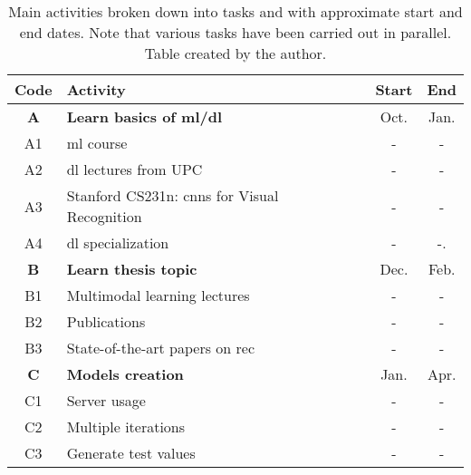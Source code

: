 \begin{table}[p]
  \centering
  \caption[Main activities broken down into tasks]{Main activities broken down
    into tasks and with approximate start and end dates. Note that various
    tasks have been carried out in parallel. Table created by the
    author.}%
  \label{tab:activities}
  \begin{tabular}{cp{}cc}
    \toprule

    \rowcolor{gray!37.5}
    \textbf{Code} & \textbf{Activity} & \textbf{Start} & \textbf{End} \\
    \midrule

    \rowcolor{rowColor}
    \textbf{A} & \textbf{Learn basics of \acs{ml}/\acs{dl}}                                      & Oct. & Jan. \\
    \rowcolor{rowColor}
    A1         & \Acs{ml} course~\cite{ng20:machin_learn}                                        & -    & -    \\
    \rowcolor{rowColor}
    A2         & \Acs{dl} lectures from UPC~\cite{giro-i-nieto20:all_deep_learn_upc_etset_telec} & -    & -    \\
    \rowcolor{rowColor}
    A3         & Stanford CS231n: \acsp{cnn} for Visual Recognition~\cite{li20:cs231}            & -    & -    \\
    \rowcolor{rowColor}
    A4         & \Acs{dl} specialization~\cite{ng20:deep_learn_special}                          & -    & -.   \\
    \midrule

    \textbf{B} & \textbf{Learn thesis topic}                                                       & Dec. & Feb. \\
    B1         & Multimodal learning lectures~\cite{giro-i-nieto20:all_deep_learn_upc_etset_telec} & -    & -    \\
    B2         & Publications                                                                      & -    & -    \\
    B3         & State-of-the-art papers on \acs{rec}                                              & -    & -    \\
    \midrule

    \rowcolor{rowColor}
    \textbf{C}             & \textbf{Models creation} & Jan. & Apr. \\
    \rowcolor{rowColor} C1 & Server usage             & -    & -    \\
    \rowcolor{rowColor} C2 & Multiple iterations      & -    & -    \\
    \rowcolor{rowColor} C3 & Generate test values     & -    & -    \\
    \midrule


\end{tabular}
\end{table}
